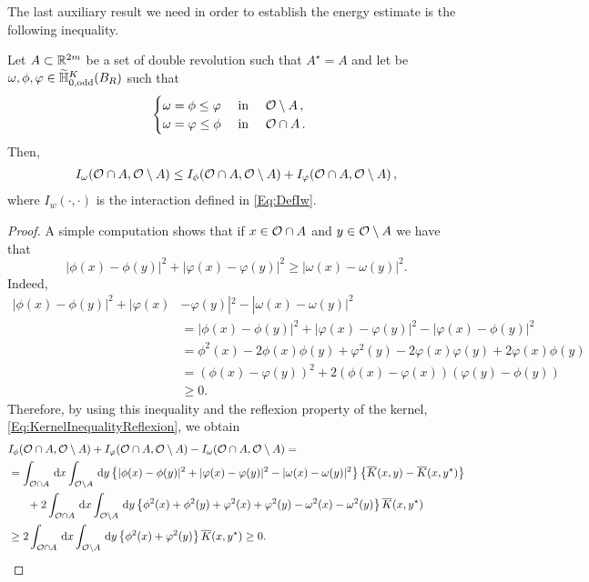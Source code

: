 The last auxiliary result we need in order to establish the energy estimate is the following inequality.

\begin{lemma}
\label{Lemma: InteractionInequalityMinimumFunction}
Let $A\subset\mathbb{R}^{2m}$ be a set of double revolution such that $A^\star = A$ and let be $\omega, \phi, \varphi \in \widetilde{\mathbb{H}}^K_{0, \mathrm{odd}}(B_R)$ such that
$$\begin{cases}
\omega = \phi \leq \varphi \ \ \ \ \textrm{in } \ \ \ \mathcal{O} \setminus A\,,\\
\omega = \varphi \leq \phi \ \ \ \ \textrm{in } \ \ \ \mathcal{O} \cap A\,.
\end{cases}$$
Then,
\begin{align*}
I_\omega(\mathcal{O}\cap A, \mathcal{O} \setminus A) \leq I_\phi(\mathcal{O}\cap A, \mathcal{O} \setminus A) + I_\varphi(\mathcal{O}\cap A, \mathcal{O} \setminus A)\,,
\end{align*}
where $I_w(\cdot, \cdot)$ is the interaction defined in \eqref{Eq:DefIw}.
\end{lemma}

\begin{proof}
A simple computation shows that if $x\in \mathcal{O} \cap A$ and $y\in \mathcal{O} \setminus A$ we have that
$$ |\phi(x)-\phi(y)|^2+|\varphi(x)-\varphi(y)|^2\geq |\omega(x)-\omega(y)|^2. $$
Indeed,
\begin{align*}
|\phi(x)-\phi(y)|^2+|\varphi(x)&-\varphi(y)|^2 - |\omega(x)-\omega(y)|^2 \\
&= |\phi(x)-\phi(y)|^2+|\varphi(x)-\varphi(y)|^2 - |\varphi(x)-\phi(y)|^2 \\
&= \phi^2(x)-2\phi(x)\phi(y)+\varphi^2(y)-2\varphi(x)\varphi(y)+2\varphi(x)\phi(y) \\
&= \left( \phi(x) - \varphi(y)\right) ^2+2\left( \phi(x)-\varphi(x) \right) \left( \varphi(y)-\phi(y) \right) \\
&\geq 0.
\end{align*}
Therefore, by using this inequality and the reflexion property of the kernel, \eqref{Eq:KernelInequalityReflexion}, we obtain
\begin{align*}
I_\phi(\ocal\cap A, \ocal \setminus A) &+ I_\varphi(\ocal\cap A, \ocal \setminus A) - I_\omega(\ocal\cap A, \ocal \setminus A) = \\
&\hspace{-26mm}= \int_{\ocal\cap A} \d x \int_{\ocal\setminus A} \d y \left\{|\phi(x)-\phi(y)|^2+|\varphi(x)-\varphi(y)|^2-|\omega(x)-\omega(y)|^2 \right\} \left\{\overline{K}(x,y)-\overline{K}(x,y^\star)\right\} \\
&\hspace{-20mm}+ 2 \int_{\ocal\cap A} \d x \int_{\ocal\setminus A} \d y \left\{\phi^2(x)+\phi^2(y)+\varphi^2(x)+\varphi^2(y)-\omega^2(x)-\omega^2(y) \right\} \overline{K}(x,y^\star) \\
&\hspace{-26mm}\geq 2\int_{\ocal\cap A} \d x \int_{\ocal\setminus A} \d y \left\{
\phi^2(x)+\varphi^2(y)\right\} \overline{K}(x,y^\star) \geq 0.
\end{align*}
\end{proof}



